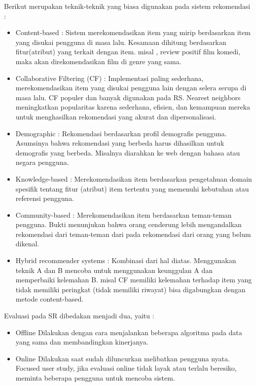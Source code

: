 \documentclass[a4paper,twoside]{article}
\begin{document}
\begin{enumerate}
		Berikut merupakan teknik-teknik yang biasa digunakan pada sistem rekomendasi :
		\begin{itemize}
			\item Content-based :
				Sistem merekomendasikan item yang mirip berdasarkan item yang disukai pengguna di masa lalu. Kesamaan dihitung berdasarkan fitur(atribut) yang terkait dengan item. misal , review positif film komedi, maka akan direkomendasikan film di genre yang sama. 
			\item Collaborative Filtering (CF) :
				Implementasi paling sederhana, merekomendasikan item yang disukai pengguna lain dengan selera serupa di masa lalu. CF populer dan banyak digunakan pada RS. Nearest neighbors meningkatkan popularitas karena sederhana, efisien, dan kemampuan mereka untuk menghasilkan rekomendasi yang akurat dan dipersonalisasi.
			\item Demographic :
				Rekomendasi berdasarkan profil demografis pengguna. Asumsinya bahwa rekomendasi yang berbeda harus dihasilkan untuk demografis yang berbeda. Misalnya diarahkan ke web dengan bahasa atau negara pengguna.
			\item Knowledge-based :
				Merekomendasikan item berdasarkan pengetahuan domain spesifik tentang fitur (atribut) item tertentu yang memenuhi kebutuhan atau referensi pengguna. 
			\item Community-based :
				Merekomendasikan item berdasarkan teman-teman pengguna. Bukti menunjukan bahwa orang cenderung lebih mengandalkan rekomendasi dari teman-teman dari pada rekomendasi dari orang yang belum dikenal. 
			\item Hybrid recommender systems :
				Kombinasi dari hal diatas. Menggunakan teknik A dan B mencoba untuk menggunakan keunggulan A dan memperbaiki kelemahan B. misal CF memiliki kelemahan terhadap item yang tidak memiliki peringkat (tidak memiliki riwayat)  bisa digabungkan dengan metode content-based.
		\end{itemize}
		
		Evaluasi pada SR dibedakan menjadi dua, yaitu :
		\begin{itemize}
			\item Offline
				Dilakukan dengan cara menjalankan beberapa algoritma pada data yang sama dan membandingkan kinerjanya.
			\item Online
				Dilakukan saat sudah diluncurkan melibatkan pengguna nyata. Focused user study, jika evaluasi online tidak layak atau terlalu beresiko, meminta beberapa pengguna untuk mencoba sistem.
		\end{itemize}
		

\end{enumerate}
\end{document}
